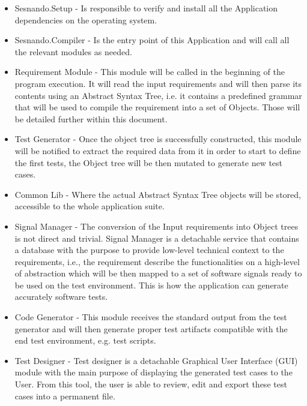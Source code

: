\begin{itemize}

\item Sesnando.Setup - Is responsible to verify and install all the Application dependencies on the operating system.

\item Sesnando.Compiler - Is the entry point of this Application and will call all the relevant modules as needed.

\item Requirement Module - This module will be called in the beginning of the program execution. It will read the input requirements and will then parse its contents using an Abstract Syntax Tree, i.e. it contains a predefined grammar that will be used to compile the requirement into a set of Objects. Those will be detailed further within this document.

\item Test Generator - Once the object tree is successfully constructed, this module will be notified to extract the required data from it in order to start to define the first tests, the Object tree will be then mutated to generate new test cases.

\item Common Lib - Where the actual Abstract Syntax Tree objects will be stored, accessible to the whole application suite.

\item Signal Manager - The conversion of the Input requirements into Object trees is not direct and trivial. Signal Manager is a detachable service that contains a database with the purpose to provide low-level technical context to the requirements, i.e., the requirement describe the functionalities on a high-level of abstraction which will be then mapped to a set of software signals ready to be used on the test environment. This is how the application can generate accurately software tests.

\item Code Generator - This module receives the standard output from the test generator and will then generate proper test artifacts compatible with the end test environment, e.g. test scripts.

\item Test Designer - Test designer is a detachable Graphical User Interface (GUI) module with the main purpose of displaying the generated test cases to the User. From this tool, the user is able to review, edit and export these test cases into a permanent file.
\end{itemize}
